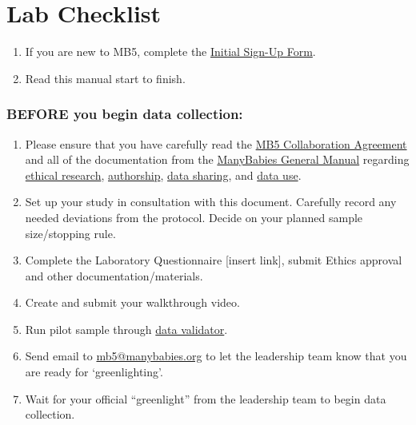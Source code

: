 \documentclass[
]{book}
\providecommand{\tightlist}{%
  \setlength{\itemsep}{0pt}\setlength{\parskip}{0pt}}
\begin{document}
\hypertarget{lab-checklist}{%
\section*{Lab Checklist}\label{lab-checklist}}

\begin{enumerate}
\def\labelenumi{\arabic{enumi}.}
\tightlist
\item
  If you are new to MB5, complete the \href{https://docs.google.com/forms/d/e/1FAIpQLSdJnP3KO_dCmj-jNPHs0XP2j3q66g1RI6L31dwhCzhwhoJeoA/viewform}{Initial Sign-Up Form}.
\item
  Read this manual start to finish.
\end{enumerate}

\hypertarget{before-you-begin-data-collection}{%
\subsubsection*{BEFORE you begin data collection:}\label{before-you-begin-data-collection}}

\begin{enumerate}
\def\labelenumi{\arabic{enumi}.}
\setcounter{enumi}{2}
\tightlist
\item
  Please ensure that you have carefully read the \href{https://docs.google.com/document/d/1vbTDmH6euda5pJN4uyds3zsnQ1DXrW9wpHogwC-5TSk/edit?usp=sharing}{MB5 Collaboration Agreement} and all of the documentation from the \href{https://docs.google.com/document/d/1dZ3sF2UcxvpkfOfKSKFeObTMZRbpUYloMUiPYtZy0ng/edit?usp=sharing}{ManyBabies General Manual} regarding \href{https://docs.google.com/document/d/1dZ3sF2UcxvpkfOfKSKFeObTMZRbpUYloMUiPYtZy0ng/edit\#heading=h.22i70rxou3ha}{ethical research}, \href{https://docs.google.com/document/d/1dZ3sF2UcxvpkfOfKSKFeObTMZRbpUYloMUiPYtZy0ng/edit\#heading=h.9ty2g48mpe0t}{authorship}, \href{https://docs.google.com/document/d/1dZ3sF2UcxvpkfOfKSKFeObTMZRbpUYloMUiPYtZy0ng/edit\#heading=h.aunbjkpwxhf3}{data sharing}, and \href{https://docs.google.com/document/d/1dZ3sF2UcxvpkfOfKSKFeObTMZRbpUYloMUiPYtZy0ng/edit\#heading=h.6h67zsyeiveg}{data use}.
\item
  Set up your study in consultation with this document. Carefully record any needed deviations from the protocol. Decide on your planned sample size/stopping rule.
\item
  Complete the Laboratory Questionnaire {[}insert link{]}, submit Ethics approval and other documentation/materials.
\item
  Create and submit your walkthrough video.
\item
  Run pilot sample through \href{https://manybabies.org/validator/}{data validator}.
\item
  Send email to \url{mb5@manybabies.org} to let the leadership team know that you are ready for `greenlighting'.
\item
  Wait for your official ``greenlight'' from the leadership team to begin data collection.
\end{enumerate}
\end{document}
